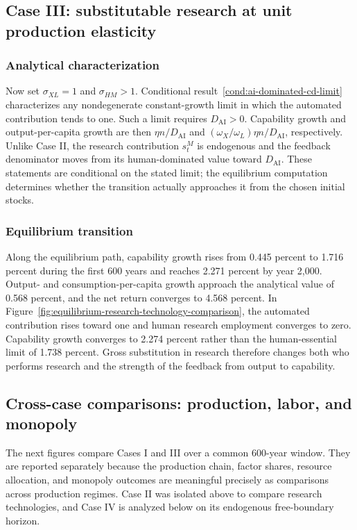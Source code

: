 \subsection{Case III: substitutable research at unit production elasticity}
\label{sec:case-substitutable-research}

\subsubsection{Analytical characterization}

Now set $\sigma_{XL}=1$ and $\sigma_{HM}>1$. Conditional
result~\ref{cond:ai-dominated-cd-limit} characterizes any nondegenerate
constant-growth limit in which the automated contribution tends to one. Such a
limit requires $D_{\mathrm{AI}}>0$. Capability growth and output-per-capita growth
are then $\eta n/D_{\mathrm{AI}}$ and
$(\omega_X/\omega_L)\eta n/D_{\mathrm{AI}}$, respectively. Unlike Case II, the
research contribution $s^M_t$ is endogenous and the feedback denominator moves
from its human-dominated value toward $D_{\mathrm{AI}}$. These statements are
conditional on the stated limit; the equilibrium computation determines whether
the transition actually approaches it from the chosen initial stocks.

\subsubsection{Equilibrium transition}

Along the equilibrium path, capability growth rises from 0.445 percent to 1.716
percent during the first 600 years and reaches 2.271 percent by year 2,000. Output-
and consumption-per-capita growth approach the analytical value of 0.568 percent,
and the net return converges to 4.568 percent. In
Figure~\ref{fig:equilibrium-research-technology-comparison}, the automated
contribution rises toward one and human research employment converges to zero.
Capability growth converges to 2.274 percent rather than the human-essential limit
of 1.738 percent. Gross substitution in research therefore changes both who
performs research and the strength of the feedback from output to capability.

\subsection{Cross-case comparisons: production, labor, and monopoly}

The next figures compare Cases I and III over a common 600-year window. They are
reported separately because the production chain, factor shares, resource
allocation, and monopoly outcomes are meaningful precisely as comparisons across
production regimes. Case II was isolated above to compare research technologies,
and Case IV is analyzed below on its endogenous free-boundary horizon.


